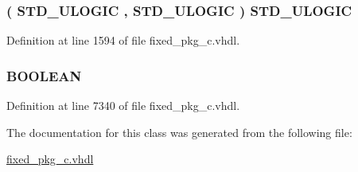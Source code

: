\subsubsection[{stdlogic\+\_\+table}]{ {\bfseries \textcolor{vhdlchar}{(}\textcolor{vhdlchar}{ }\textcolor{comment}{S\+T\+D\+\_\+\+U\+L\+O\+G\+I\+C}\textcolor{vhdlchar}{ }\textcolor{vhdlchar}{ }\textcolor{vhdlchar}{,}\textcolor{vhdlchar}{ }\textcolor{comment}{S\+T\+D\+\_\+\+U\+L\+O\+G\+I\+C}\textcolor{vhdlchar}{ }\textcolor{vhdlchar}{ }\textcolor{vhdlchar}{)}\textcolor{vhdlchar}{ }\textcolor{vhdlchar}{ }\textcolor{comment}{S\+T\+D\+\_\+\+U\+L\+O\+G\+I\+C}\textcolor{vhdlchar}{ }} \hspace{0.3cm}{\ttfamily [Type]}}\label{class__fixed__pkg_a0836495acd435e1eea69bfb97f880575}


Definition at line 1594 of file fixed\+\_\+pkg\+\_\+c.\+vhdl.

\hypertarget{class__fixed__pkg_a73f9cce55faa4f1d41ba7ea34d447f88}{}
\subsubsection[{xgood}]{ {\bfseries \textcolor{comment}{B\+O\+O\+L\+E\+A\+N}\textcolor{vhdlchar}{ }} \hspace{0.3cm}{\ttfamily [Shared Variable]}}\label{class__fixed__pkg_a73f9cce55faa4f1d41ba7ea34d447f88}


Definition at line 7340 of file fixed\+\_\+pkg\+\_\+c.\+vhdl.



The documentation for this class was generated from the following file\+:\begin{DoxyCompactItemize}
\item 
\hyperlink{fixed__pkg__c_8vhdl}{fixed\+\_\+pkg\+\_\+c.\+vhdl}\end{DoxyCompactItemize}
